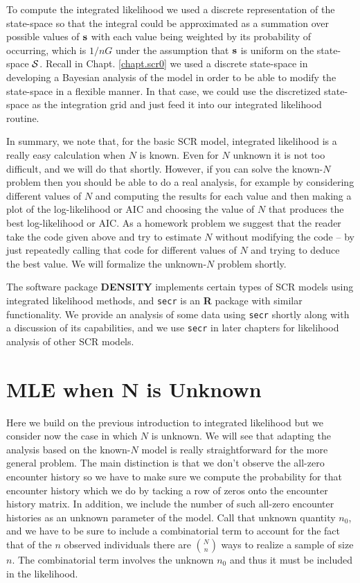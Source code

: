 To compute the integrated likelihood we used a discrete representation
of the state-space so that the integral could be approximated as a
summation over possible values of ${\bf s}$ with each value being
weighted by its probability of occurring, which is $1/nG$ under the
assumption that ${\bf s}$ is uniform on the state-space ${\cal
  S}$. Recall
in Chapt. \ref{chapt.scr0} we 
used a discrete state-space in developing a Bayesian analysis of the
model in order to be able to modify the state-space in a flexible
manner. In that case, we could use the discretized state-space as the
integration grid and just feed it into our integrated likelihood
routine. 

In summary, we note that, for the basic SCR model, integrated
likelihood is a really easy calculation when $N$ is known. Even for $N$
unknown it is not too difficult, and we will do that shortly.
However, if you can solve the known-$N$ problem then you should be able
to do a real analysis, for example by considering different values of
$N$ and computing the results for each value and then making a plot of
the log-likelihood or AIC and choosing the value of $N$ that produces
the best log-likelihood or AIC. As a homework problem we suggest that
the reader take the code given above and try to estimate $N$ without
modifying the code – by just repeatedly calling that code for
different values of $N$ and trying to deduce the best value.
We will formalize the unknown-$N$ problem shortly.

The
software package {\bf DENSITY} \citep{efford_etal:2004} implements
certain types of SCR models using integrated likelihood methods, and
\mbox{\tt secr} \citep{efford:2011} is an {\bf R} package with similar functionality.
We provide an analysis of some data using \mbox{\tt secr} shortly along
with a discussion of its capabilities, and we use \mbox{\tt secr} in
later chapters for likelihood analysis of other SCR models.


\section{MLE when N is Unknown} 

Here we build on the previous introduction to integrated likelihood
but we consider now the case in which $N$ is unknown. We will see that
adapting the analysis based on the known-$N$ model is really
straightforward for the more general problem. The main distinction is
that we don’t observe the all-zero encounter history so we have to
make sure we compute the probability for that encounter history which
we do by tacking a row of zeros onto the encounter history matrix. In
addition, we include the number of such all-zero encounter histories
as an unknown parameter of the model. Call that unknown quantity
$n_{0}$, and we have to 
be sure to include a combinatorial term to
account for the fact that of the $n$ observed individuals there are
${N \choose n}$
 ways to realize a sample of size $n$. The combinatorial term
involves the unknown $n_{0}$ and thus it must be included in the likelihood.

